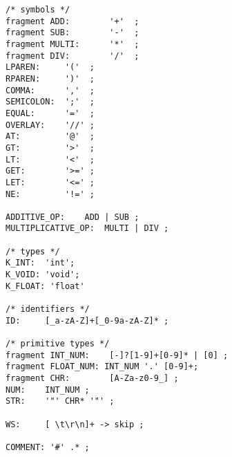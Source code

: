 \documentclass[11pt,letterpaper]{article}
\begin{document}
\begin{lstlisting}[tabsize=4]
/* symbols */
fragment ADD:        '+'  ;
fragment SUB:        '-'  ;
fragment MULTI:      '*'  ;
fragment DIV:        '/'  ;
LPAREN:     '('  ;
RPAREN:     ')'  ;
COMMA:      ','  ;
SEMICOLON:  ';'  ;
EQUAL:      '='  ;
OVERLAY:    '//' ;
AT:         '@'  ;
GT:         '>'  ;
LT:         '<'  ;
GET:        '>=' ;
LET:        '<=' ;
NE:         '!=' ;

ADDITIVE_OP:    ADD | SUB ;
MULTIPLICATIVE_OP:  MULTI | DIV ;

/* types */
K_INT:  'int';
K_VOID: 'void';
K_FLOAT: 'float'

/* identifiers */
ID:     [_a-zA-Z]+[_0-9a-zA-Z]* ;   

/* primitive types */
fragment INT_NUM:    [-]?[1-9]+[0-9]* | [0] ;    
fragment FLOAT_NUM: INT_NUM '.' [0-9]+; 
fragment CHR:        [A-Za-z0-9_] ;
NUM:    INT_NUM ;
STR:    '"' CHR* '"' ;

WS:     [ \t\r\n]+ -> skip ;

COMMENT: '#' .* ;
\end{lstlisting}	
\end{document}
